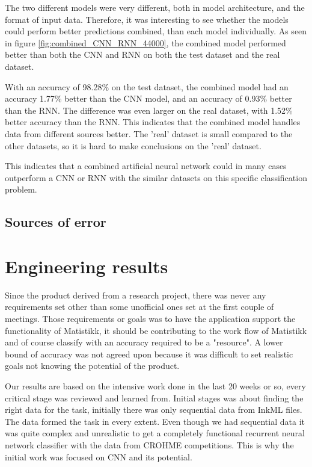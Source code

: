 The two different models were very different, both in model architecture, and the format of input data. Therefore, it was interesting to see whether the models could perform better predictions combined, than each model individually. As seen in figure \ref{fig:combined_CNN_RNN_44000}, the combined model performed better than both the CNN and RNN on both the test dataset and the real dataset. 

With an accuracy of 98.28\% on the test dataset, the combined model had an accuracy 1.77\% better than the CNN model, and an accuracy of 0.93\% better than the RNN. The difference was even larger on the real dataset, with 1.52\% better accuracy than the RNN. This indicates that the combined model handles data from different sources better. The 'real' dataset is small compared to the other datasets, so it is hard to make conclusions on the 'real' dataset. 

This indicates that a combined artificial neural network could in many cases outperform a CNN or RNN with the similar datasets on this specific classification problem. 

\subsection{Sources of error}

\section{Engineering results}


Since the product derived from a research project, there was never any requirements set other than some unofficial ones set at the first couple of meetings. Those requirements or goals was to have the application support the functionality of Matistikk, it should be contributing to the work flow of Matistikk and of course classify with an accuracy required to be a "resource". A lower bound of accuracy was not agreed upon because it was difficult to set realistic goals not knowing the potential of the product. 

Our results are based on the intensive work done in the last 20 weeks or so, every critical stage was reviewed and learned from. Initial stages was about finding the right data for the task, initially there was only sequential data from InkML files. The data formed the task in every extent. Even though we had sequential data it was quite complex and unrealistic to get a completely functional recurrent neural network classifier with the data from CROHME competitions. This is why the initial work was focused on CNN and its potential.  %



